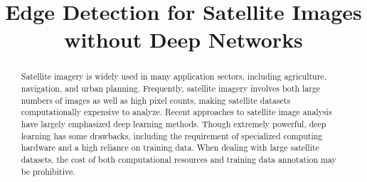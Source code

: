 \documentclass[conference]{IEEEtran}
\begin{document}
\title{Edge Detection for Satellite Images without Deep Networks}

\author{
}

\maketitle

\begin{abstract}

Satellite imagery is widely used in many application sectors, including agriculture, navigation, and urban planning. Frequently, satellite imagery involves both large numbers of images as well as high pixel counts, making satellite datasets computationally expensive to analyze. Recent approaches to satellite image analysis have largely emphasized deep learning methods. Though extremely powerful, deep learning has some drawbacks, including the requirement of specialized computing hardware and a high reliance on training data. When dealing with large satellite datasets, the cost of both computational resources and training data annotation may be prohibitive.



\end{abstract}
\end{document}
